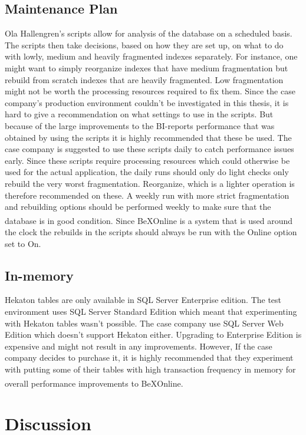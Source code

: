 \documentclass{cslthse-msc}
\newcommand{\bex}{BeX\textsuperscript{\textregistered}}
\begin{document}
\section{Maintenance Plan}
Ola Hallengren's \cite{Hallengren15} scripts allow for analysis of the database on a scheduled basis. The scripts then take decisions, based on how they are set up, on what to do with lowly, medium and heavily fragmented indexes separately. For instance, one might want to simply reorganize indexes that have medium fragmentation but rebuild from scratch indexes that are heavily fragmented. Low fragmentation might not be worth the processing resources required to fix them. Since the case company's production environment couldn't be investigated in this thesis, it is hard to give a recommendation on what settings to use in the scripts. But because of the large improvements to the BI-reports performance that was obtained by using the scripts it is highly recommended that these be used. The case company is suggested to use these scripts daily to catch performance issues early. Since these scripts require  processing resources which could otherwise be used for the actual application, the daily runs should only do light checks only rebuild the very worst fragmentation. Reorganize, which is a lighter operation is therefore recommended on these. A weekly run with more strict fragmentation and rebuilding options should be performed weekly to make sure that the database is in good condition. Since \bex Online is a system that is used around the clock the rebuilds in the scripts should always be run with the Online option set to On.

\section{In-memory}
Hekaton tables are only available in SQL Server Enterprise edition. The test environment uses SQL Server Standard Edition which meant that experimenting with Hekaton tables wasn't possible. The case company use SQL Server Web Edition which doesn't support Hekaton either. Upgrading to Enterprise Edition is expensive and might not result in any improvements. However, If the case company decides to purchase it, it is highly recommended that they experiment with putting some of their tables with high transaction frequency in memory for overall performance improvements to \bex Online.

\chapter{Discussion}\label{sec:discussion}
\end{document}
